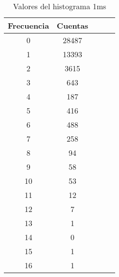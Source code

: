 \begin{center}
\begin{table}[H]
\caption{Valores del histograma 1ms}
\label{Tab:histo_1s}
\begin{tabular}{ccccc}
\toprule
Frecuencia & Cuentas \\
\midrule
\num{    0} & \num{28487} \\
\num{    1} & \num{13393} \\
\num{    2} & \num{ 3615} \\
\num{    3} & \num{  643} \\
\num{    4} & \num{  187} \\
\num{    5} & \num{  416} \\
\num{    6} & \num{  488} \\
\num{    7} & \num{  258} \\
\num{    8} & \num{   94} \\
\num{    9} & \num{   58} \\
\num{   10} & \num{   53} \\
\num{   11} & \num{   12} \\
\num{   12} & \num{    7} \\
\num{   13} & \num{    1} \\
\num{   14} & \num{    0} \\
\num{   15} & \num{    1} \\
\num{   16} & \num{    1} \\
\bottomrule
\end{tabular}
\end{table}
\end{center}
